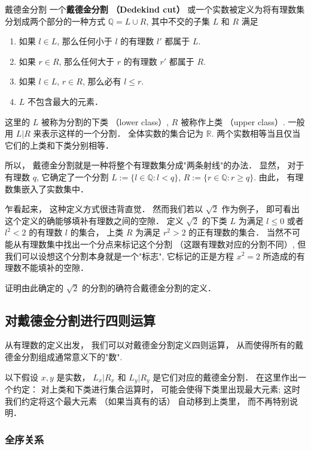 \begin{definition}{戴德金分割}
一个\textbf{戴德金分割 （Dedekind cut）} 或一个实数被定义为将有理数集分划成两个部分的一种方式 $\mathbb{Q}=L\cup R$, 其中不交的子集 $L$ 和 $R$ 满足

\begin{enumerate}
\item 如果 $l\in L$, 那么任何小于 $l$ 的有理数 $l'$ 都属于 $L$.
\item 如果 $r\in R$, 那么任何大于 $r$ 的有理数 $r'$ 都属于 $R$.
\item 如果 $l\in L$, $r\in R$, 那么必有 $l\leq r$.
\item $L$ 不包含最大的元素．
\end{enumerate}

这里的 $L$ 被称为分割的下类 （lower class）, $R$ 被称作上类 （upper class）. 一般用 $L|R$ 来表示这样的一个分割． 全体实数的集合记为 $\mathbb{R}$. 两个实数相等当且仅当它们的上类和下类分别相等．
\end{definition}

所以， 戴德金分割就是一种将整个有理数集分成"两条射线"的办法． 显然， 对于有理数 $q$, 它确定了一个分割 $L:=\{l\in\mathbb{Q}:l<q\}$, $R:=\{r\in\mathbb{Q}:r\geq q\}$. 由此， 有理数集嵌入了实数集中．

乍看起来， 这种定义方式很违背直觉． 然而我们若以 $\sqrt{2}$ 作为例子， 即可看出这个定义的确能够填补有理数之间的空隙． 定义 $\sqrt{2}$ 的下类 $L$ 为满足 $l\leq0$ 或者 $l^2<2$ 的有理数 $l$ 的集合， 上类 $R$ 为满足 $r^2>2$ 的正有理数的集合． 当然不可能从有理数集中找出一个分点来标记这个分割 （这跟有理数对应的分割不同）, 但我们可以设想这个分割本身就是一个"标志", 它标记的正是方程 $x^2=2$ 所造成的有理数不能填补的空隙．
\begin{exercise}{}
证明由此确定的 $\sqrt{2}$ 的分割的确符合戴德金分割的定义．
\end{exercise}

\subsection{对戴德金分割进行四则运算}
从有理数的定义出发， 我们可以对戴德金分割定义四则运算， 从而使得所有的戴德金分割组成通常意义下的"数". 

以下假设 $x,y$ 是实数， $L_x| R_x$ 和 $L_y| R_y$ 是它们对应的戴德金分割． 在这里作出一个约定： 对上类和下类进行集合运算时， 可能会使得下类里出现最大元素; 这时我们约定将这个最大元素 （如果当真有的话） 自动移到上类里， 而不再特别说明．

\subsubsection{全序关系}

